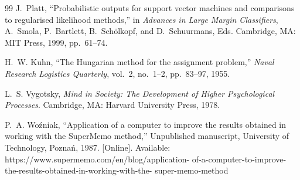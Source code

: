 \documentclass[12pt,a4paper]{article}
\begin{document}
\begin{thebibliography}{99}
J.~Platt,
``Probabilistic outputs for support vector machines and comparisons
to regularised likelihood methods,''
in \textit{Advances in Large Margin Classifiers},
A.~Smola, P.~Bartlett, B.~Sch\"{o}lkopf, and D.~Schuurmans, Eds.
Cambridge, MA: MIT Press, 1999, pp.~61--74.

H.~W. Kuhn,
``The Hungarian method for the assignment problem,''
\textit{Naval Research Logistics Quarterly}, vol.~2,
no.~1--2, pp.~83--97, 1955.

L.~S. Vygotsky,
\textit{Mind in Society: The Development of Higher Psychological
Processes}.
Cambridge, MA: Harvard University Press, 1978.

P.~A. Wo\'{z}niak,
``Application of a computer to improve the results obtained in
working with the SuperMemo method,''
Unpublished manuscript, University of Technology, Pozna\'{n}, 1987.
[Online]. Available: https://www.supermemo.com/en/blog/application-%
of-a-computer-to-improve-the-results-obtained-in-working-with-the-%
super-memo-method

\end{thebibliography}
\end{document}
